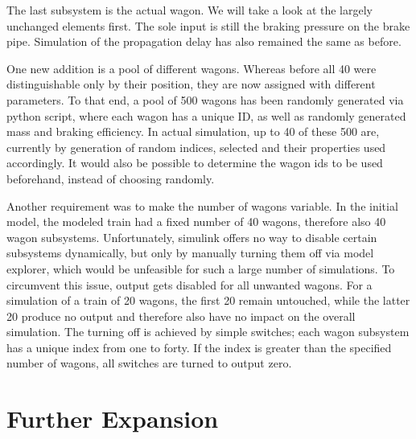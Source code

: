 \par\noindent
The last subsystem is the actual wagon. We will take a look at the largely unchanged elements first. The sole input is still the braking pressure on the brake pipe. Simulation of the propagation delay has also remained the same as before. 

\par
One new addition is a pool of different wagons. Whereas before all 40 were distinguishable only by their position, they are now assigned with different parameters. To that end, a pool of 500 wagons has been randomly generated via python script, where each wagon has a unique ID, as well as randomly generated mass and braking efficiency. In actual simulation, up to 40 of these 500 are, currently by generation of random indices, selected and their properties used accordingly. It would also be possible to determine the wagon ids to be used beforehand, instead of choosing randomly.

\par
Another requirement was to make the number of wagons variable. In the initial model, the modeled train had a fixed number of 40 wagons, therefore also 40 wagon subsystems. Unfortunately, simulink offers no way to disable certain subsystems dynamically, but only by manually turning them off via model explorer, which would be unfeasible for such a large number of simulations. To circumvent this issue, output gets disabled for all unwanted wagons. For a simulation of a train of 20 wagons, the first 20 remain untouched, while the latter 20 produce no output and therefore also have no impact on the overall simulation. The turning off is achieved by simple switches; each wagon subsystem has a unique index from one to forty. If the index is greater than the specified number of wagons, all switches are turned to output zero.
	
\section{Further Expansion}
\label{sec:FurtherExpansion}